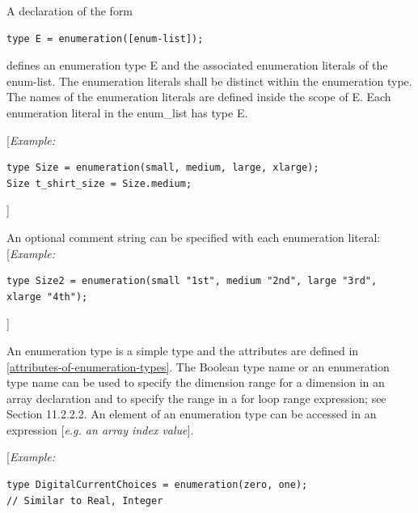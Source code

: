 \documentclass[10pt,a4paper]{report}
\def\Mcomment#1{{[}\emph{#1}{]}}
\def\Mcommentbegin#1{{[}\emph{#1}}
\def\Mcommentend#1{\emph{#1}{]}}
\begin{document}
A declaration of the form
\begin{lstlisting}[language=modelica]
 type E = enumeration([enum-list]);
\end{lstlisting}

defines an enumeration type E and the associated enumeration literals of
the enum-list. The enumeration literals shall be distinct within the
enumeration type. The names of the enumeration literals are defined
inside the scope of E. Each enumeration literal in the enum\_list has
type E.

\Mcommentbegin{Example:}
\begin{lstlisting}[language=modelica]
type Size = enumeration(small, medium, large, xlarge);
Size t_shirt_size = Size.medium;
\end{lstlisting}
\Mcommentend{}

An optional comment string can be specified with each enumeration literal:
\Mcommentbegin{Example:}
\begin{lstlisting}[language=modelica]
type Size2 = enumeration(small "1st", medium "2nd", large "3rd", xlarge "4th");
\end{lstlisting}
\Mcommentend{}

An enumeration type is a simple type and the attributes are defined in
\ref{attributes-of-enumeration-types}. The Boolean type name or an enumeration type name can
be used to specify the dimension range for a dimension in an array
declaration and to specify the range in a for loop range expression; see
Section 11.2.2.2. An element of an enumeration type can be accessed in
an expression \Mcomment{e.g. an array index value}.

\Mcommentbegin{Example:}
\begin{lstlisting}[language=modelica]
type DigitalCurrentChoices = enumeration(zero, one);
// Similar to Real, Integer
\end{lstlisting}
\end{document}

